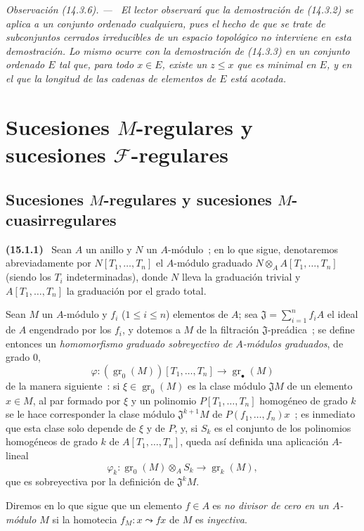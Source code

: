 \documentclass[10pt,oneside]{book}
\makeatletter
\newcommand{\gr}{\operatorname{gr}}
\newcommand{\setmanualcurrentlabel}[1]{\def\@currentlabel{#1}}
\newcommand{\oldpage}[2][]{%
  \setcounter{footnote}{0}%
  \marginpar{\scriptsize\textbf{#1}~|~#2}\ignorespaces}
\newenvironment{env}[1][]{\setmanualcurrentlabel{#1}\par\medskip\noindent\textbf{(#1)}\ }{\par}
\newenvironment{remark}[1][]{%
  \setmanualcurrentlabel{#1}\par\medskip\noindent\itshape Observación (#1). ---\ }{\par}
\makeatother
\begin{document}
\begin{remark}[14.3.6]
\label{0.14.3.6-es}
El lector observará que la demostración de (14.3.2) se aplica a un conjunto
ordenado cualquiera, pues el hecho de que se trate de subconjuntos cerrados
irreducibles de un espacio topológico no interviene en esta demostración. Lo
mismo ocurre con la demostración de (14.3.3) en un conjunto ordenado $E$ tal
que, para todo $x\in E$, existe un $z\leq x$ que es \emph{minimal} en $E$, y en
el que la longitud de las cadenas de elementos de $E$ está acotada.
\end{remark}

\section{Sucesiones \texorpdfstring{$M$}{M}-regulares y sucesiones
\texorpdfstring{$\mathscr F$}{F}-regulares}
\label{section:0.15-es}

\subsection{Sucesiones \texorpdfstring{$M$}{M}-regulares y sucesiones
\texorpdfstring{$M$}{M}-cuasirregulares}
\label{subsection:0.15.1-es}
\label{0.15.1-es}

\begin{env}[15.1.1]
\label{0.15.1.1-es}
\oldpage[0\textsubscript{IV-1}]{12}
Sean $A$ un anillo y $N$ un $A$-módulo~; en lo que sigue, denotaremos
abreviadamente por $N[T_1,\ldots,T_n]$ el $A$-módulo graduado
$N\otimes_A A[T_1,\ldots,T_n]$ (siendo los $T_i$ indeterminadas), donde $N$
lleva la graduación trivial y $A[T_1,\ldots,T_n]$ la graduación por el grado total.

Sean $M$ un $A$-módulo y $f_i$ ($1\leq i\leq n$) elementos de $A$;
sea $\mathfrak{J}=\sum_{i=1}^n f_iA$ el ideal de $A$ engendrado por los $f_i$,
y dotemos a $M$ de la filtración $\mathfrak{J}$-preádica~; se define entonces un
\emph{homomorfismo graduado sobreyectivo de $A$-módulos graduados}, de grado $0$,
\[
  \varphi : (\gr_0(M))[T_1,\ldots,T_n]\longrightarrow\gr_\bullet(M)
  \tag{15.1.1.1}\label{0.15.1.1.1-es}
\]
de la manera siguiente~: si $\xi\in\gr_0(M)$ es la clase módulo
$\mathfrak{J}M$ de un elemento $x\in M$, al par formado por $\xi$ y un
polinomio $P[T_1,\ldots,T_n]$ homogéneo de grado $k$ se le hace corresponder la
clase módulo $\mathfrak{J}^{k+1}M$ de $P(f_1,\ldots,f_n)x$~; es inmediato
que esta clase
\oldpage[0\textsubscript{IV-1}]{13}
solo depende de $\xi$ y de $P$, y, si $S_k$ es el conjunto de los polinomios
homogéneos de grado $k$ de $A[T_1,\ldots,T_n]$, queda así definida una
aplicación $A$-lineal
\[
  \varphi_k:\gr_0(M)\otimes_A S_k\longrightarrow\gr_k(M),
\]
que es sobreyectiva por la definición de $\mathfrak{J}^kM$.

Diremos en lo que sigue que un elemento $f\in A$ es \emph{no divisor de
cero en un $A$-módulo $M$} si la homotecia $f_M:x\leadsto fx$ de $M$ es
\emph{inyectiva}.
\end{env}
\end{document}
